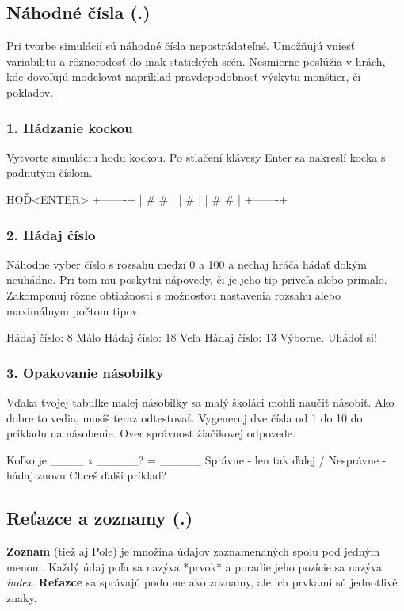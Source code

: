 \subsection{Náhodné čísla (.)}
Pri tvorbe simulácií sú náhodné čísla nepostrádateľné. Umožňujú vniesť variabilitu a rôznorodosť do inak statických scén. Nesmierne poslúžia v hrách, kde dovoľujú modelovať napríklad pravdepodobnosť výskytu monštier, či pokladov.


\subsubsection*{1. Hádzanie kockou}
Vytvorte simuláciu hodu kockou. Po stlačení klávesy Enter sa nakreslí kocka s padnutým číslom.

\begin{code}
HOĎ<ENTER>
+-------+
| #   # |
|   #   |
| #   # |
+-------+
\end{code}

\subsubsection*{2. Hádaj číslo}
Náhodne vyber číslo s rozsahu medzi 0 a 100 a nechaj hráča hádať dokým neuhádne. Pri tom mu poskytni nápovedy, či je jeho tip priveľa alebo primalo. Zakomponuj rôzne obtiažnosti s možnosťou nastavenia rozsahu alebo maximálnym počtom tipov.

\begin{code}
Hádaj číslo: 8
Málo
Hádaj číslo: 18
Veľa
Hádaj číslo: 13
Výborne. Uhádol si!
\end{code}

\subsubsection*{3. Opakovanie násobilky}
Vďaka tvojej tabuľke malej násobilky sa malý školáci mohli naučiť násobiť. Ako dobre to vedia, musíš teraz odtestovať. Vygeneruj dve čísla od 1 do 10 do príkladu na násobenie. Over správnosť žiačikovej odpovede.

\begin{code}
Koľko je ____ x _____?
= _____
Správne - len tak ďalej / Nesprávne - hádaj znovu
Chceš ďalší príklad?
\end{code}


\subsection{Reťazce a zoznamy (.)}
\textbf{Zoznam} (tiež aj Pole) je množina údajov zaznamenaných spolu pod jedným menom. Každý údaj poľa sa nazýva *prvok* a poradie jeho pozície sa nazýva \textit{index}. \textbf{Reťazce} sa správajú podobne ako zoznamy, ale ich prvkami sú jednotlivé znaky.


